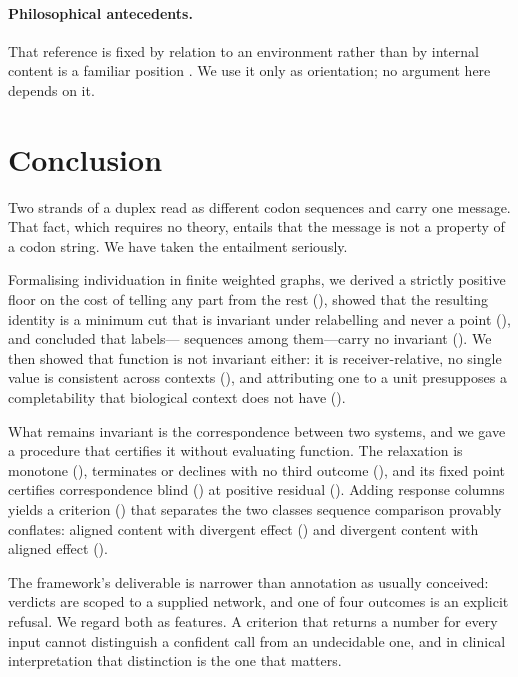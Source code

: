 \documentclass[11pt,twocolumn,a4paper]{article}
\theoremstyle{definition}
\theoremstyle{remark}
\begin{document}
\paragraph{Philosophical antecedents.} That reference is fixed by relation
to an environment rather than by internal content is a familiar position
\citep{quine1960,putnam1975}. We use it only as orientation; no argument
here depends on it.

\section{Conclusion}
\label{sec:conclusion}

Two strands of a duplex read as different codon sequences and carry one
message. That fact, which requires no theory, entails that the message is
not a property of a codon string. We have taken the entailment seriously.

Formalising individuation in finite weighted graphs, we derived a strictly
positive floor on the cost of telling any part from the rest
(), showed that the resulting identity is a minimum cut
that is invariant under relabelling and never a point
(), and concluded that labels---%
sequences among them---carry no invariant (). We then
showed that function is not invariant either: it is receiver-relative, no
single value is consistent across contexts (), and
attributing one to a unit presupposes a completability that biological
context does not have ().

What remains invariant is the correspondence between two systems, and we
gave a procedure that certifies it without evaluating function. The
relaxation is monotone (), terminates or declines with no
third outcome (), and its fixed point certifies
correspondence blind () at positive residual
(). Adding response columns yields a criterion
() that separates the two classes sequence comparison
provably conflates: aligned content with divergent effect
() and divergent content with aligned effect
().

The framework's deliverable is narrower than annotation as usually
conceived: verdicts are scoped to a supplied network, and one of four
outcomes is an explicit refusal. We regard both as features. A criterion
that returns a number for every input cannot distinguish a confident call
from an undecidable one, and in clinical interpretation that distinction
is the one that matters.
\end{document}
